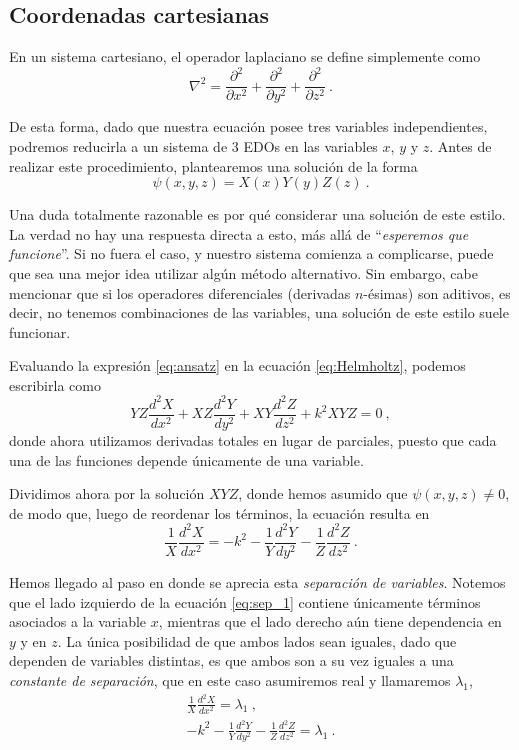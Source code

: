 \subsection{Coordenadas cartesianas}

En un sistema cartesiano, el operador laplaciano se define simplemente como
\begin{equation}
    \nabla^2 = \frac{\partial^2}{\partial x^2} + \frac{\partial^2}{\partial y^2} + \frac{\partial^2}{\partial z^2} \ .
\end{equation}

De esta forma, dado que nuestra ecuación posee tres variables independientes, podremos reducirla a un sistema de 3 EDOs en las variables $x$, $y$ y $z$. Antes de realizar este procedimiento, plantearemos una solución de la forma
\begin{equation}\label{eq:ansatz}
    \psi(x,y,z) = X(x)Y(y)Z(z) \ .
\end{equation}

Una duda totalmente razonable es por qué considerar una solución de este estilo. La verdad no hay una respuesta directa a esto, más allá de ``\emph{esperemos que funcione}''. Si no fuera el caso, y nuestro sistema comienza a complicarse, puede que sea una mejor idea utilizar algún método alternativo. Sin embargo, cabe mencionar que si los operadores diferenciales (derivadas $n$-ésimas) son aditivos, es decir, no tenemos combinaciones de las variables, una solución de este estilo suele funcionar.

Evaluando la expresión \eqref{eq:ansatz} en la ecuación \eqref{eq:Helmholtz}, podemos escribirla como
\begin{equation}
    YZ \frac{d^2X}{dx^2} + XZ \frac{d^2 Y}{dy^2} + XY \frac{d^2Z}{dz^2} + k^2 XYZ = 0 \ ,
\end{equation}
donde ahora utilizamos derivadas totales en lugar de parciales, puesto que cada una de las funciones depende únicamente de una variable.

Dividimos ahora por la solución $XYZ$, donde hemos asumido que $\psi(x,y,z) \neq 0$, de modo que, luego de reordenar los términos, la ecuación resulta en
\begin{equation} \label{eq:sep_1}
    \frac{1}{X} \frac{d^2 X}{dx^2} = -k^2 - \frac{1}{Y} \frac{d^2 Y}{dy^2} - \frac{1}{Z} \frac{d^2 Z}{dz^2} \ .
\end{equation}

Hemos llegado al paso en donde se aprecia esta \emph{separación de variables}. Notemos que el lado izquierdo de la ecuación \eqref{eq:sep_1} contiene únicamente términos asociados a la variable $x$, mientras que el lado derecho aún tiene dependencia en $y$ y en $z$. La única posibilidad de que ambos lados sean iguales, dado que dependen de variables distintas, es que ambos son a su vez iguales a una \emph{constante de separación}, que en este caso asumiremos real y llamaremos $\lambda_1$,
\begin{align}
    \frac{1}{X} \frac{d^2 X}{dx^2} = \lambda_1 \ , \\
    -k^2 - \frac{1}{Y} \frac{d^2Y}{dy^2} - \frac{1}{Z} \frac{d^2Z}{dz^2} = \lambda_1 \ . \label{eq:EDO_de_y_z}
\end{align}

